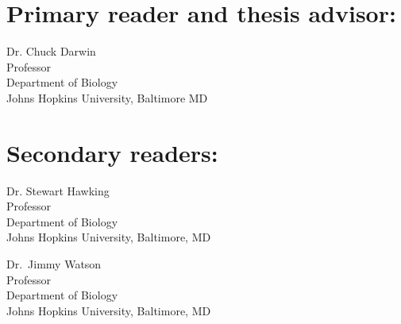 \clearpage
{} 

\Blindtext[3]


\begin{singlespace}

\section*{Primary reader and thesis advisor:}

Dr. Chuck Darwin \\
Professor\\
Department of Biology\\
Johns Hopkins University, Baltimore MD 



\section*{Secondary readers:}

Dr. Stewart Hawking\\
Professor\\
Department of Biology \\
Johns Hopkins University, Baltimore, MD 

\vspace{0.1in}

Dr.~Jimmy Watson \\
Professor\\
Department of Biology \\
Johns Hopkins University, Baltimore, MD 


\end{singlespace}